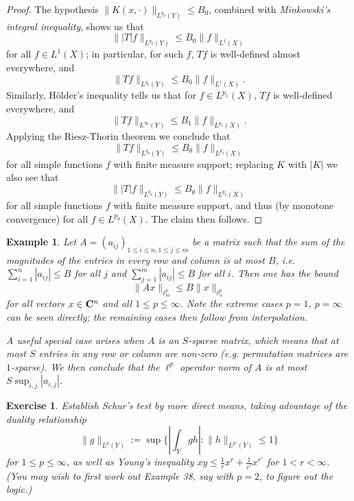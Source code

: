 \documentclass[10pt,reqno]{amsart}
\newtheorem{exercise}[theorem]{Exercise}
\newtheorem{example}[theorem]{Example}
\begin{document}
\begin{proof}
The hypothesis $\| K(x, \cdot) \|_{L^{q_0}(Y)} \leq B_0$, combined with \emph{Minkowski’s integral inequality}, shows us that
%
\[ \| |T| f \|_{L^{q_0}(Y)} \leq B_0 \|f\|_{L^1(X)}\]
%
for all $f \in L^1(X)$; in particular, for such $f$, $Tf$ is well-defined almost everywhere, and
%
\[ \| T f \|_{L^{q_0}(Y)} \leq B_0 \|f\|_{L^1(X)}.\]
%
Similarly, Hölder’s inequality tells us that for $f \in L^{p_1}(X)$, $Tf$ is well-defined everywhere, and
%
\[ \| T f \|_{L^{\infty}(Y)} \leq B_1 \|f\|_{L^{p_1}(X)}.\]
%
Applying the Riesz-Thorin theorem we conclude that
%
\[ \| T f \|_{L^{q_\theta}(Y)} \leq B_\theta \|f\|_{L^{p_\theta}(X)}\]
%
for all simple functions $f$ with finite measure support; replacing $K$ with $|K|$ we also see that
%
\[ \| |T| f \|_{L^{q_\theta}(Y)} \leq B_\theta \|f\|_{L^{p_\theta}(X)}\]
%
for all simple functions $f$ with finite measure support, and thus (by monotone convergence) for all $f \in L^{p_\theta}(X)$. The claim then follows.
\end{proof}

\begin{example}
    Let $A = (a_{ij})_{1 \leq i \leq n, 1 \leq j \leq m}$ be a matrix such that the sum of the magnitudes of the entries in every row and column is at most $B$, i.e. $\sum_{i=1}^n |a_{ij}| \leq B$ for all $j$ and $\sum_{j=1}^m |a_{ij}| \leq B$ for all $i$. Then one has the bound
\[     \| Ax \|_{\ell^p_m} \leq B \|x\|_{\ell^p_n}\]
    for all vectors $x \in {\bf C}^n$ and all $1 \leq p \leq \infty$. Note the extreme cases $p=1$, $p=\infty$ can be seen directly; the remaining cases then follow from interpolation.

    A useful special case arises when $A$ is an \emph{$S$-sparse} matrix, which means that at most $S$ entries in any row or column are non-zero (e.g. permutation matrices are $1$-sparse). We then conclude that the $\ell^p$ operator norm of $A$ is at most $S \sup_{i,j} |a_{i,j}|$.
\end{example}

\begin{exercise}
    Establish Schur’s test by more direct means, taking advantage of the duality relationship
\[     \|g\|_{L^p(Y)} := \sup \{ |\int_Y g h|: \|h\|_{L^{p'}(Y)} \leq 1 \}\]
    for $1 \leq p \leq \infty$, as well as \emph{Young’s inequality} $xy \leq \frac{1}{r} x^r +\frac{1}{r'} x^{r'}$ for $1 < r < \infty$. (You may wish to first work out Example 38, say with $p=2$, to figure out the logic.) 
\end{exercise}
\end{document}
